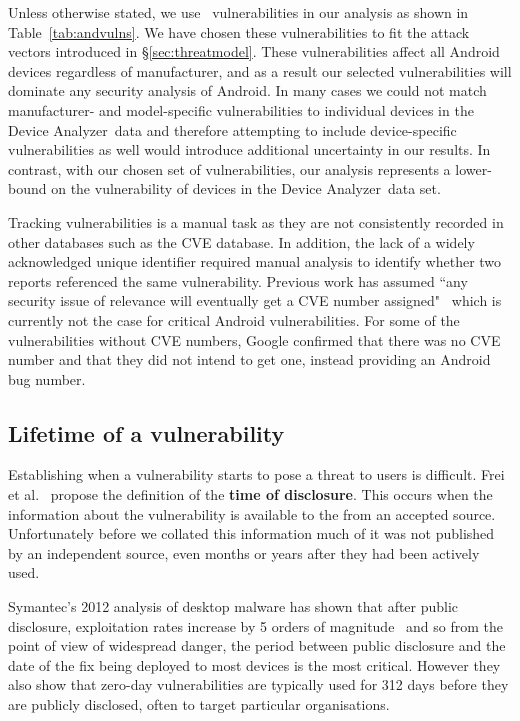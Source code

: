 \documentclass{llncs}
\newcommand{\da}{Device Analyzer}
\begin{document}
Unless otherwise stated, we use \daNumVulnsUsed\ vulnerabilities in our analysis as shown in Table~\ref{tab:andvulns}.
We have chosen these vulnerabilities to fit the attack vectors introduced in \S\ref{sec:threatmodel}.
These vulnerabilities affect all Android devices regardless of manufacturer, and as a result our selected vulnerabilities will dominate any security analysis of Android.
In many cases we could not match manufacturer- and model-specific vulnerabilities to individual devices in the \da\ data and therefore attempting to include device-specific vulnerabilities as well would introduce additional uncertainty in our results.
In contrast, with our chosen set of vulnerabilities, our analysis represents a lower-bound on the vulnerability of devices in the \da\ data set.

Tracking vulnerabilities is a manual task as they are not consistently recorded in other databases such as the CVE database.
In addition, the lack of a widely acknowledged unique identifier required manual analysis to identify whether two reports referenced the same vulnerability.
Previous work has assumed ``any security issue of relevance will eventually get a CVE number assigned"~\cite{Frei2010} which is currently not the case for critical Android vulnerabilities.
For some of the vulnerabilities without CVE numbers, Google confirmed that there was no CVE number and that they did not intend to get one, instead providing an Android bug number.


\subsection{Lifetime of a vulnerability}

Establishing when a vulnerability starts to pose a threat to users is difficult.
Frei et al.~\cite{Frei2010} propose the definition of the \textbf{time of disclosure}.
This occurs when the information about the vulnerability is available to the from an accepted source.
Unfortunately before we collated this information much of it was not published by an independent source, even months or years after they had been actively used.

Symantec's 2012 analysis of desktop malware has shown that after public disclosure, exploitation rates increase by 5 orders of magnitude~\cite{Bilge2012} and so from the point of view of widespread danger, the period between public disclosure and the date of the fix being deployed to most devices is the most critical.
However they also show that zero-day vulnerabilities are typically used for 312 days before they are publicly disclosed, often to target particular organisations.
\end{document}
